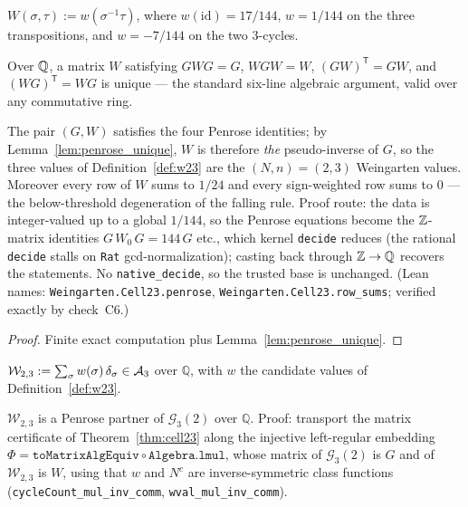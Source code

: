 \begin{definition}\label{def:w23}
\leanok
$W(\sigma,\tau):=w(\sigma^{-1}\tau)$, where $w(\mathrm{id})=17/144$,
$w=1/144$ on the three transpositions, and $w=-7/144$ on the two
$3$-cycles.
\end{definition}

\begin{lemma}\label{lem:penrose_unique}
\leanok
Over $\mathbb{Q}$, a matrix $W$ satisfying $GWG=G$, $WGW=W$,
$(GW)^{\mathsf T}=GW$, and $(WG)^{\mathsf T}=WG$ is unique --- the
standard six-line algebraic argument, valid over any commutative ring.
\end{lemma}

\begin{theorem}\label{thm:cell23}
\leanok
{}
The pair $(G,W)$ satisfies the four Penrose identities; by
Lemma~\ref{lem:penrose_unique}, $W$ is therefore \emph{the}
pseudo-inverse of $G$, so the three values of Definition~\ref{def:w23}
are the $(N,n)=(2,3)$ Weingarten values. Moreover every row of $W$ sums
to $1/24$ and every sign-weighted row sums to $0$ --- the below-threshold
degeneration of the falling rule. Proof route: the data is integer-valued
up to a global $1/144$, so the Penrose equations become the $\mathbb{Z}$-matrix
identities $G\,W_0\,G=144\,G$ etc., which kernel \texttt{decide} reduces
(the rational \texttt{decide} stalls on \texttt{Rat} gcd-normalization);
casting back through $\mathbb{Z}\to\mathbb{Q}$ recovers the statements. No
\texttt{native\_decide}, so the trusted base is unchanged. (Lean names:
\texttt{Weingarten.Cell23.penrose}, \texttt{Weingarten.Cell23.row\_sums};
verified exactly by check~C6.)
\end{theorem}
\begin{proof}
\leanok
{}
Finite exact computation plus Lemma~\ref{lem:penrose_unique}.
\end{proof}

\begin{definition}\label{def:wcell}
\leanok
{}
$\mathcal W_{2,3}:=\sum_\sigma w(\sigma)\,\delta_\sigma\in\mathcal{A}_{3}$ over
$\mathbb{Q}$, with $w$ the candidate values of Definition~\ref{def:w23}.
\end{definition}

\begin{theorem}\label{thm:penrose_alg}
\leanok
{}
$\mathcal W_{2,3}$ is a Penrose partner of $\mathcal G_3(2)$ over
$\mathbb{Q}$. Proof: transport the matrix certificate of
Theorem~\ref{thm:cell23} along the injective left-regular embedding
$\Phi=\texttt{toMatrixAlgEquiv}\circ\texttt{Algebra.lmul}$, whose matrix of
$\mathcal G_3(2)$ is $G$ and of $\mathcal W_{2,3}$ is $W$, using that
$w$ and $N^{c}$ are inverse-symmetric class functions
(\texttt{cycleCount\_mul\_inv\_comm}, \texttt{wval\_mul\_inv\_comm}).
\end{theorem}


